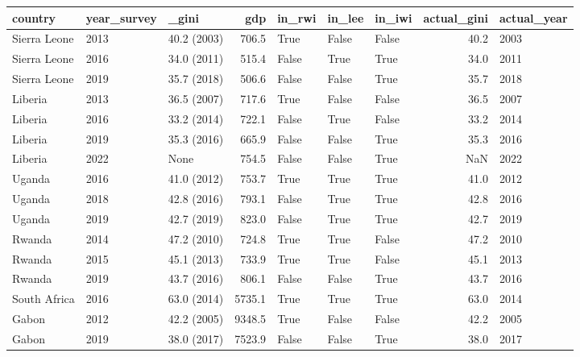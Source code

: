 \begin{tabular}{lllrlllrl}
\toprule
     country & year\_survey &       \_gini &    gdp & in\_rwi & in\_lee & in\_iwi &  actual\_gini & actual\_year \\
\midrule
Sierra Leone &        2013 & 40.2 (2003) &  706.5 &   True &  False &  False &         40.2 &        2003 \\
Sierra Leone &        2016 & 34.0 (2011) &  515.4 &  False &   True &   True &         34.0 &        2011 \\
Sierra Leone &        2019 & 35.7 (2018) &  506.6 &  False &  False &   True &         35.7 &        2018 \\
     Liberia &        2013 & 36.5 (2007) &  717.6 &   True &  False &  False &         36.5 &        2007 \\
     Liberia &        2016 & 33.2 (2014) &  722.1 &  False &   True &  False &         33.2 &        2014 \\
     Liberia &        2019 & 35.3 (2016) &  665.9 &  False &  False &   True &         35.3 &        2016 \\
     Liberia &        2022 &        None &  754.5 &  False &  False &   True &          NaN &        2022 \\
      Uganda &        2016 & 41.0 (2012) &  753.7 &   True &   True &   True &         41.0 &        2012 \\
      Uganda &        2018 & 42.8 (2016) &  793.1 &  False &   True &   True &         42.8 &        2016 \\
      Uganda &        2019 & 42.7 (2019) &  823.0 &  False &   True &   True &         42.7 &        2019 \\
      Rwanda &        2014 & 47.2 (2010) &  724.8 &   True &   True &  False &         47.2 &        2010 \\
      Rwanda &        2015 & 45.1 (2013) &  733.9 &   True &   True &  False &         45.1 &        2013 \\
      Rwanda &        2019 & 43.7 (2016) &  806.1 &  False &  False &   True &         43.7 &        2016 \\
South Africa &        2016 & 63.0 (2014) & 5735.1 &   True &   True &   True &         63.0 &        2014 \\
       Gabon &        2012 & 42.2 (2005) & 9348.5 &   True &  False &  False &         42.2 &        2005 \\
       Gabon &        2019 & 38.0 (2017) & 7523.9 &  False &  False &   True &         38.0 &        2017 \\
\bottomrule
\end{tabular}
